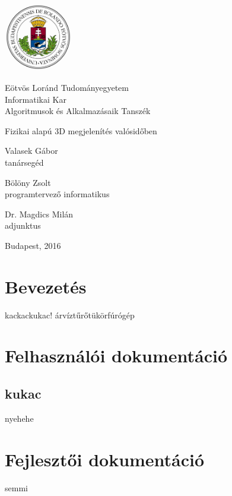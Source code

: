 \documentclass[12pt,oneside]{book}
\begin{document}

\begin{titlepage}

\noindent
\begin{minipage}{4cm}
    \includegraphics[width=3cm]{cimer_nagy_szines.png}
\end{minipage}
\hfill
\begin{minipage}[c]{8cm}
Eötvös Loránd Tudományegyetem\\
Informatikai Kar\\
Algoritmusok és Alkalmazásaik Tanszék
\end{minipage}

\vspace{5cm}

\begin{center}
\huge
Fizikai alapú 3D megjelenítés valósidőben
\end{center}

\vspace{4cm}

\noindent
\begin{minipage}[t]{7cm}
\flushleft
Valasek Gábor\\
tanársegéd
\end{minipage}
\hfill
\begin{minipage}[t]{5.2cm}
Bölöny Zsolt\\
programtervező informatikus
\end{minipage}

\vspace{1cm}

\noindent
\begin{minipage}[t]{7cm}
\flushleft
Dr. Magdics Milán\\
adjunktus
\end{minipage}

\begin{center}
Budapest, 2016
\end{center}

\end{titlepage}


\tableofcontents


\chapter{Bevezetés}
kackackukac! árvíztűrőtükörfúrógép


\chapter{Felhasználói dokumentáció}
\section{kukac}
nyehehe

\chapter{Fejlesztői dokumentáció}
semmi
\end{document}
